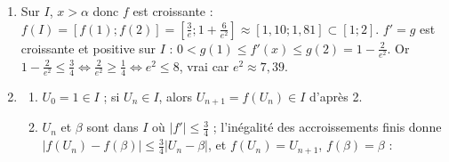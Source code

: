 \begin{description}
\begin{enumerate}
		\begin{enumerate}
			\item {}
				$h'(x) = f'(x) - 1 = g(x) - 1 = -(x^2 - 2x + 2)\expo{-x}$.
				Or $x^2 - 2x + 2 = (x-1)^2 + 1 > 0$, donc $h'(x) < 0$ : $h$ est strictement décroissante sur $I$.
				$h(1) = f(1) - 1 = \frac{3}{\expo{1}} - 1 \approx 0{,}10$ et $h(2) = f(2) - 2 = \frac{6}{\expo{2}} - 1 \approx -0{,}19$.
				\[
				\begin{array}{c|ccc}
					x & 1 & & 2 \\ \hline
					h'(x) & & - & \\ \hline
					 & \frac{3}{e} - 1 & & \\
					h & & \searrow & \\
					 & & & \frac{6}{e^2} - 1
				\end{array}
				\]
			\item {}
				$h$ est continue, strictement décroissante sur $I$, avec $h(1) > 0 > h(2)$ : $h(x) = 0$, c'est-à-dire $f(x) = x$, a une unique solution dans $I$.
				\par\noindent{}
		\end{enumerate}
		\item {}
			Sur $I$, $x > \alpha$ donc $f$ est croissante : $f(I) = [f(1) ; f(2)] = \left[\frac{3}{e} ; 1 + \frac{6}{e^2}\right] \approx [1{,}10 ; 1{,}81] \subset [1;2]$.
			$f' = g$ est croissante et positive sur $I$ : $0 < g(1) \leq f'(x) \leq g(2) = 1 - \frac{2}{e^2}$.
			Or $1 - \frac{2}{e^2} \leq \frac{3}{4} \iff \frac{2}{e^2} \geq \frac{1}{4} \iff e^2 \leq 8$, vrai car $e^2 \approx 7{,}39$.
			\par\noindent{}
		\item
		\begin{enumerate}
			\item {}
				$U_0 = 1 \in I$ ; si $U_n \in I$, alors $U_{n+1} = f(U_n) \in I$ d'après 2.
				\par\noindent{}
			\item {}
				$U_n$ et $\beta$ sont dans $I$ où $|f'| \leq \frac{3}{4}$ ; l'inégalité des accroissements finis donne
				$|f(U_n) - f(\beta)| \leq \frac{3}{4}|U_n - \beta|$, et $f(U_n) = U_{n+1}$, $f(\beta) = \beta$ :

\end{enumerate}
\end{enumerate}
\end{description}
